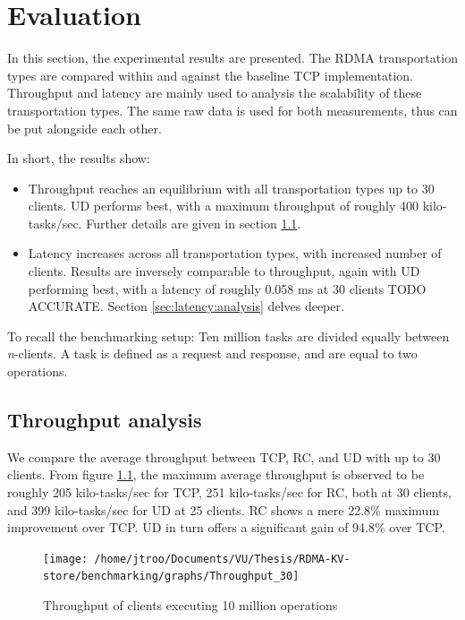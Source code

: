 
\chapter{Evaluation}\label{ch:evaluation} %



\ifpdf
    \graphicspath{{figures/PNG}}
\else
    \graphicspath{{7/figures/EPS/}{7/figures/}}
\fi


% 
In this section, the experimental results are presented.
The RDMA transportation types are compared within and against the baseline TCP implementation.
Throughput and latency are mainly used to analysis the scalability of these transportation types.
The same raw data is used for both measurements, thus can be put alongside each other.

In short, the results show:
\begin{itemize}
    \item Throughput reaches an equilibrium with all transportation types up to 30 clients.
    UD performs best, with a maximum throughput of roughly 400 kilo-tasks/sec.
    Further details are given in section \ref{sec:throughput-analysis}.
    \item Latency increases across all transportation types, with increased number of clients.
    Results are inversely comparable to throughput, again with UD performing best, with a latency of roughly 0.058 ms at 30 clients TODO ACCURATE.
    Section \ref{sec:latency:analysis} delves deeper.
\end{itemize}

To recall the benchmarking setup:
Ten million tasks are divided equally between \textit{n}-clients.
A task is defined as a request and response, and are equal to two operations.

\section{Throughput analysis}\label{sec:throughput-analysis}
We compare the average throughput between TCP, RC, and UD with up to 30 clients.
From figure \ref{fig:throughput-30}, the maximum average throughput is observed to be roughly 205 kilo-tasks/sec for TCP, 251 kilo-tasks/sec for RC, both at 30 clients, and 399 kilo-tasks/sec for UD at 25 clients.
RC shows a mere 22.8\% maximum improvement over TCP.
UD in turn offers a significant gain of 94.8\% over TCP.
\begin{figure}
    \centering
    \texttt{[image: /home/jtroo/Documents/VU/Thesis/RDMA-KV-store/benchmarking/graphs/Throughput\_30]}
    \caption{Throughput of clients executing 10 million operations}
    \label{fig:throughput-30}
\end{figure}


